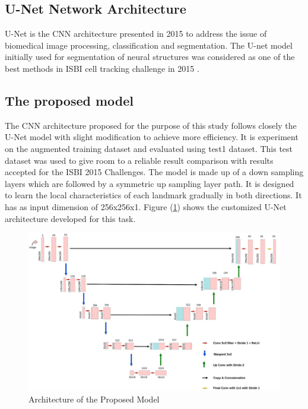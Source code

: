 \documentclass{elektr}
\begin{document}
\subsection{U-Net Network Architecture}
\tab U-Net \cite{ref10} is the CNN architecture presented in 2015 to address the issue of biomedical image processing, classification and segmentation. The U-net model initially used for segmentation of neural structures was considered as one of the best methods in ISBI cell tracking challenge in 2015 \cite{ref11}. 


\subsection{The proposed model }

The CNN architecture proposed for the purpose of this study follows closely the U-Net model with slight modification to achieve more efficiency. It is experiment on the augmented training dataset and evaluated using test1 dataset. This test dataset was used to give room to a reliable result comparison with results accepted for the ISBI 2015 Challenges. The model is made up of a down sampling layers which are followed by a symmetric up sampling layer path. It is designed to learn the local characteristics of each landmark gradually in both directions. It has as input dimension of 256x256x1. Figure (\ref{fig2}) shows the customized U-Net architecture developed for this task.



\begin{figure}[H]
	\begin{center}
		\includegraphics[width=6.3in]{./media/image2}
		\caption{Architecture of the Proposed Model}
		\label{fig2}
	\end{center}\vs{-4mm}
\end{figure}
\end{document}
